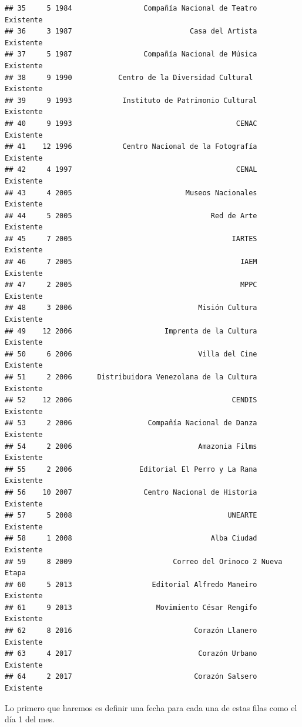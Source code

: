 \documentclass[]{article}
\newenvironment{Shaded}{\begin{snugshade}}{\end{snugshade}}
\newcommand{\DecValTok}[1]{\textcolor[rgb]{0.00,0.00,0.81}{#1}}
\newcommand{\KeywordTok}[1]{\textcolor[rgb]{0.13,0.29,0.53}{\textbf{#1}}}
\newcommand{\NormalTok}[1]{#1}
\newcommand{\OperatorTok}[1]{\textcolor[rgb]{0.81,0.36,0.00}{\textbf{#1}}}
\newcommand{\StringTok}[1]{\textcolor[rgb]{0.31,0.60,0.02}{#1}}
\begin{document}
\begin{verbatim}
## 35     5 1984                 Compañía Nacional de Teatro   Existente
## 36     3 1987                            Casa del Artista   Existente
## 37     5 1987                 Compañía Nacional de Música   Existente
## 38     9 1990           Centro de la Diversidad Cultural    Existente
## 39     9 1993            Instituto de Patrimonio Cultural   Existente
## 40     9 1993                                       CENAC   Existente
## 41    12 1996            Centro Nacional de la Fotografía   Existente
## 42     4 1997                                       CENAL   Existente
## 43     4 2005                           Museos Nacionales   Existente
## 44     5 2005                                 Red de Arte   Existente
## 45     7 2005                                      IARTES   Existente
## 46     7 2005                                        IAEM   Existente
## 47     2 2005                                        MPPC   Existente
## 48     3 2006                              Misión Cultura   Existente
## 49    12 2006                      Imprenta de la Cultura   Existente
## 50     6 2006                              Villa del Cine   Existente
## 51     2 2006      Distribuidora Venezolana de la Cultura   Existente
## 52    12 2006                                      CENDIS   Existente
## 53     2 2006                  Compañía Nacional de Danza   Existente
## 54     2 2006                              Amazonia Films   Existente
## 55     2 2006                Editorial El Perro y La Rana   Existente
## 56    10 2007                 Centro Nacional de Historia   Existente
## 57     5 2008                                     UNEARTE   Existente
## 58     1 2008                                 Alba Ciudad   Existente
## 59     8 2009                        Correo del Orinoco 2 Nueva Etapa
## 60     5 2013                   Editorial Alfredo Maneiro   Existente
## 61     9 2013                    Movimiento César Rengifo   Existente
## 62     8 2016                             Corazón Llanero   Existente
## 63     4 2017                              Corazón Urbano   Existente
## 64     2 2017                             Corazón Salsero   Existente
\end{verbatim}

Lo primero que haremos es definir una fecha para cada una de estas filas
como el día 1 del mes.

\begin{Shaded}
\end{Shaded}
\end{document}
